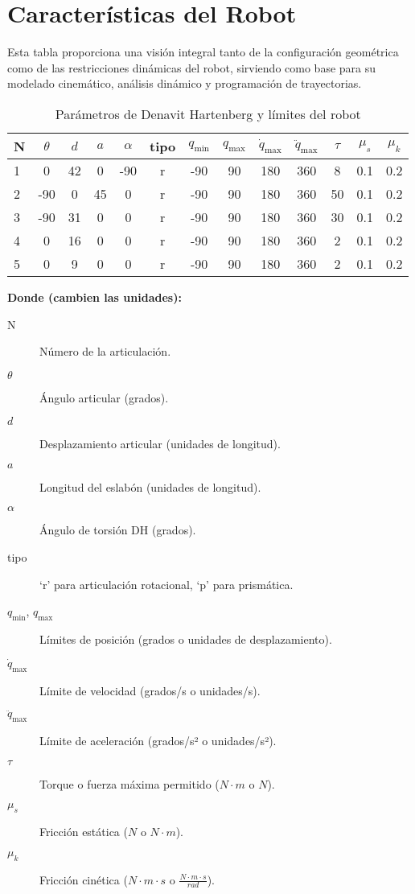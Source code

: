 \section{Características del Robot} \label{sec:caracteristicas_del_robot}

Esta tabla proporciona una visión integral tanto de la configuración geométrica como de las restricciones dinámicas del robot, sirviendo como base para su modelado cinemático, análisis dinámico y programación de trayectorias.

\begin{table}[ht]
	\centering
	\caption{Parámetros de Denavit Hartenberg y límites del robot}
	\label{tab:parametros_robot}
	\begin{tabular}{ l|cccccccccccc
		}
		\toprule
		N & {$\theta$} & {$d$} & {$a$} & {$\alpha$} & {tipo} 
		& {$q_{\min}$} & {$q_{\max}$} 
		& {$\dot q_{\max}$} & {$\ddot q_{\max}$} 
		& {$\tau$} & {$\mu_s$} & {$\mu_k$} \\
		\midrule
		1 & 0 & 42 & 0  & -90  & r & -90 & 90 & 180 & 360 &  8  & 0.1 & 0.2 \\
		2 & -90 & 0 & 45 & 0 & r & -90 & 90 & 180 & 360 & 50  & 0.1 & 0.2 \\
		3 & -90 & 31 & 0  & 0 & r & -90 & 90 & 180 & 360 & 30  & 0.1 & 0.2 \\
		4 & 0 & 16 & 0  & 0   & r & -90 &  90 &  180 &  360 & 2  & 0.1 & 0.2 \\
		5 & 0 & 9 & 0  & 0   & r &   -90 &  90 &   180 &   360 & 2  & 0.1 & 0.2 \\
		\bottomrule
	\end{tabular}
\end{table}
\bigskip
\noindent
\textbf{Donde (cambien las unidades):}
\begin{description}
	\item[N] Número de la articulación.
	\item[\(\theta\)] Ángulo articular (grados).
	\item[\(d\)] Desplazamiento articular (unidades de longitud).
	\item[\(a\)] Longitud del eslabón (unidades de longitud).
	\item[\(\alpha\)] Ángulo de torsión DH (grados).
	\item[tipo] ‘r’ para articulación rotacional, ‘p’ para prismática.
	\item[\(q_{\min}\), \(q_{\max}\)] Límites de posición (grados o unidades de desplazamiento).
	\item[\(\dot q_{\max}\)] Límite de velocidad (grados/s o unidades/s).
	\item[\(\ddot q_{\max}\)] Límite de aceleración (grados/s² o unidades/s²).
	\item[\(\tau\)] Torque o fuerza máxima permitido (\(N \cdot m\) o \(N\)).
	\item[\(\mu_s\)] Fricción estática (\(N\) o \(N \cdot m\)).
	\item[\(\mu_k\)] Fricción cinética (\(N \cdot m \cdot s\) o \(\frac{N \cdot m \cdot s}{rad}\)).
\end{description}

